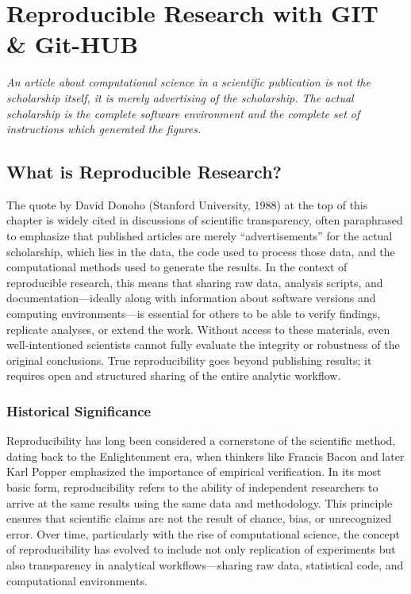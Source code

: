 \chapter{Reproducible Research with GIT \& Git-HUB}

\epigraph{\textit{An article about computational science in a scientific publication is not the scholarship itself, it is merely advertising of the scholarship. The actual scholarship is the complete software environment and the complete set of instructions which generated the figures.}}{}

\minitoc
\newpage
\section{What is Reproducible Research?}
The quote by David Donoho (Stanford University, 1988) at the top of this chapter is widely cited in discussions of scientific transparency, often paraphrased to emphasize that published articles are merely ``advertisements'' for the actual scholarship, which lies in the data, the code used to process those data, and the computational methods used to generate the results. In the context of reproducible research, this means that sharing raw data, analysis scripts, and documentation—ideally along with information about software versions and computing environments—is essential for others to be able to verify findings, replicate analyses, or extend the work. Without access to these materials, even well-intentioned scientists cannot fully evaluate the integrity or robustness of the original conclusions. True reproducibility goes beyond publishing results; it requires open and structured sharing of the entire analytic workflow.

\subsection*{Historical Significance}
Reproducibility has long been considered a cornerstone of the scientific method, dating back to the Enlightenment era, when thinkers like Francis Bacon and later Karl Popper emphasized the importance of empirical verification. In its most basic form, reproducibility refers to the ability of independent researchers to arrive at the same results using the same data and methodology. This principle ensures that scientific claims are not the result of chance, bias, or unrecognized error. Over time, particularly with the rise of computational science, the concept of reproducibility has evolved to include not only replication of experiments but also transparency in analytical workflows—sharing raw data, statistical code, and computational environments.

